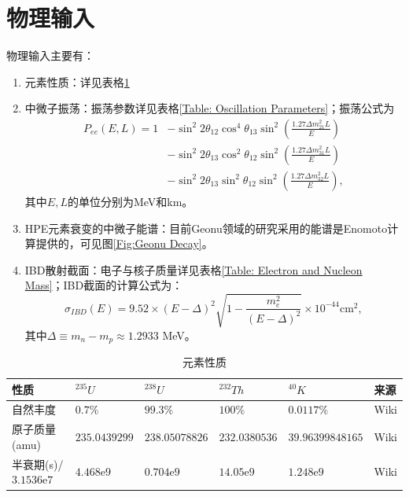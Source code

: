 		\section{物理输入}
			物理输入主要有：
				\begin{enumerate}
					\item 元素性质：详见表格\ref{Table: Element Properties}
					\item 中微子振荡：振荡参数详见表格\ref{Table: Oscillation Parameters}；振荡公式为
						\begin{equation}
							\begin{aligned}
								P_{ee}(E, L)
								= 1  
								&- \sin^2 2\theta_{12}\cos^4 \theta_{13} \sin^2\left(\frac{1.27 \Delta m_{21}^2 L}{E}\right) \\
								&- \sin^2 2\theta_{13}\cos^2 \theta_{12} \sin^2\left(\frac{1.27 \Delta m_{31}^2 L}{E}\right) \\
								&- \sin^2 2\theta_{13}\sin^2 \theta_{12} \sin^2\left(\frac{1.27 \Delta m_{32}^2 L}{E}\right),
							\end{aligned}
						\end{equation}
					其中$E, L$的单位分别为MeV和km。
					\item HPE元素衰变的中微子能谱：目前Geonu领域的研究采用的能谱是Enomoto计算提供的\cite{Enomoto_Spectrum}，可见图\ref{Fig:Geonu Decay}。
					\item IBD散射截面：电子与核子质量详见表格\ref{Table: Electron and Nucleon Mass}；IBD截面的计算公式为：
						\begin{equation}
							\sigma_{IBD}(E)
							= 9.52 \times (E - \Delta)^2 \sqrt{1 - \frac{m_e^2}{(E - \Delta)^2}} \times 10^{-44} \text{cm}^2,
						\end{equation}
					其中$\Delta \equiv m_n - m_p \approx 1.2933$ MeV。
				\end{enumerate}
				\begin{table}[H]
					\centering
					\caption{元素性质}
					\begin{tabular}{p{3.5cm}|p{2cm}p{2cm}p{2cm}p{3cm}|p{2cm}}
						\hline
						\hline
						性质 & ${}^{235}U$ & ${}^{238}U$ & ${}^{232}Th$ & ${}^{40}K$ & 来源\\
						\hline
						自然丰度 & $0.7\%$ & $99.3\%$ & $100\%$ & $0.0117\%$ & Wiki\\
						\hline
						原子质量(amu) & $235.0439299$& $238.05078826$ & $232.0380536$ & $39.96399848165$ & Wiki \\
						\hline
						半衰期(s)/$3.1536$e$7$ & $4.468$e$9$ & $0.704$e$9$ & $14.05$e$9$ & $1.248$e$9$ & Wiki \\
						\hline
						\hline
					\end{tabular}
					\label{Table: Element Properties}
				\end{table}
